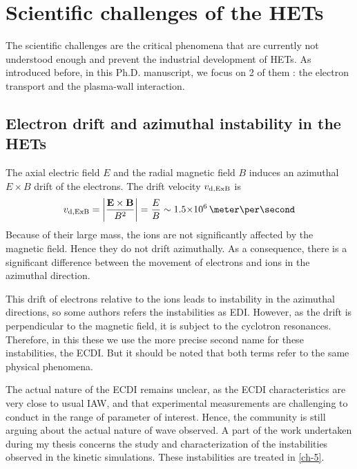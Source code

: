 
\section*{Scientific challenges of the HETs}

The scientific challenges are the critical phenomena that are currently not understood enough and prevent the industrial development of \ac{HET}s.
As introduced before, in this Ph.D. manuscript, we focus on 2 of them : the electron transport and the plasma-wall interaction.


\subsection*{Electron drift and azimuthal instability in the HETs}

The axial electric field $E$ and the radial magnetic field $B$ induces an azimuthal $E\times B$ drift of the electrons.
The drift velocity $v_{\rm d, ExB}$ is 
\begin{equation} \label{eq-exbdriftbis}
  v_{\rm d, ExB} = \bigg\lvert \frac{\vect{E} \times \vect{B}}{B^2} \bigg\rvert = \frac{E}{B} \sim \sn{1.5}{6} \,\meter\per\second
\end{equation}
Because of their large mass, the ions are not significantly affected by the magnetic field.
Hence they do not drift azimuthally.
As a consequence, there is a significant difference between the movement of electrons and ions in the azimuthal direction.

This drift of electrons relative to the ions leads to instability in the azimuthal directions, so some  authors refers the instabilities as \ac{EDI}.
However, as the drift is perpendicular to the magnetic field, it is subject to the cyclotron resonances.
Therefore, in this these we use the more precise second name for these instabilities, the \ac{ECDI}.
But it should be noted that both terms refer to the same physical phenomena.

The actual nature of the \ac{ECDI} remains unclear\citep{boeuf2018}, as the \ac{ECDI} characteristics are very close to usual \ac{IAW}, and that experimental measurements are challenging to conduct in the range of parameter of interest.
Hence, the community is still arguing about the actual nature of wave observed.
A part of the work undertaken during my thesis concerns the study and characterization of the instabilities observed in the kinetic simulations.
These instabilities are treated in \cref{ch-5}.


